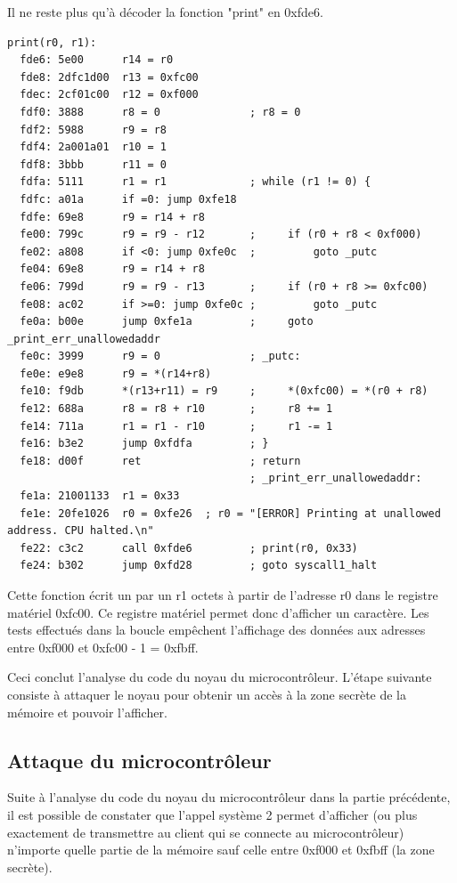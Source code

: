 \documentclass[a4paper,10pt]{article}
\begin{document}
Il ne reste plus qu'à décoder la fonction "print" en 0xfde6.
\begin{verbatim}
print(r0, r1):
  fde6: 5e00      r14 = r0
  fde8: 2dfc1d00  r13 = 0xfc00
  fdec: 2cf01c00  r12 = 0xf000
  fdf0: 3888      r8 = 0              ; r8 = 0
  fdf2: 5988      r9 = r8
  fdf4: 2a001a01  r10 = 1
  fdf8: 3bbb      r11 = 0
  fdfa: 5111      r1 = r1             ; while (r1 != 0) {
  fdfc: a01a      if =0: jump 0xfe18
  fdfe: 69e8      r9 = r14 + r8
  fe00: 799c      r9 = r9 - r12       ;     if (r0 + r8 < 0xf000)
  fe02: a808      if <0: jump 0xfe0c  ;         goto _putc
  fe04: 69e8      r9 = r14 + r8
  fe06: 799d      r9 = r9 - r13       ;     if (r0 + r8 >= 0xfc00)
  fe08: ac02      if >=0: jump 0xfe0c ;         goto _putc
  fe0a: b00e      jump 0xfe1a         ;     goto _print_err_unallowedaddr
  fe0c: 3999      r9 = 0              ; _putc:
  fe0e: e9e8      r9 = *(r14+r8)
  fe10: f9db      *(r13+r11) = r9     ;     *(0xfc00) = *(r0 + r8)
  fe12: 688a      r8 = r8 + r10       ;     r8 += 1
  fe14: 711a      r1 = r1 - r10       ;     r1 -= 1
  fe16: b3e2      jump 0xfdfa         ; }
  fe18: d00f      ret                 ; return
                                      ; _print_err_unallowedaddr:
  fe1a: 21001133  r1 = 0x33
  fe1e: 20fe1026  r0 = 0xfe26  ; r0 = "[ERROR] Printing at unallowed address. CPU halted.\n"
  fe22: c3c2      call 0xfde6         ; print(r0, 0x33)
  fe24: b302      jump 0xfd28         ; goto syscall1_halt
\end{verbatim}

Cette fonction écrit un par un r1 octets à partir de l'adresse r0 dans le registre matériel 0xfc00. Ce registre matériel permet donc d'afficher un caractère. Les tests effectués dans la boucle empêchent l'affichage des données aux adresses entre 0xf000 et 0xfc00 - 1 = 0xfbff.

Ceci conclut l'analyse du code du noyau du microcontrôleur. L'étape suivante consiste à attaquer le noyau pour obtenir un accès à la zone secrète de la mémoire et pouvoir l'afficher.

\subsection{Attaque du microcontrôleur}

Suite à l'analyse du code du noyau du microcontrôleur dans la partie précédente, il est possible de constater que l'appel système 2 permet d'afficher (ou plus exactement de transmettre au client qui se connecte au microcontrôleur) n'importe quelle partie de la mémoire sauf celle entre 0xf000 et 0xfbff (la zone secrète).
\end{document}
